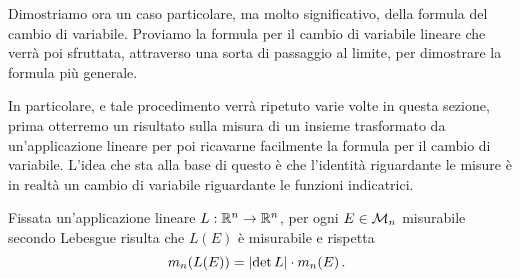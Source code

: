 Dimostriamo ora un caso particolare, ma molto significativo, della formula del cambio di variabile. 
Proviamo la formula per il cambio di variabile lineare che verrà poi sfruttata, attraverso una sorta di passaggio al limite, per dimostrare la formula più generale.

In particolare, e tale procedimento verrà ripetuto varie volte in questa sezione, prima otterremo un risultato sulla misura di un insieme trasformato da un'applicazione lineare per poi ricavarne facilmente la formula per il cambio di variabile. L'idea che sta alla base di questo è che l'identità riguardante le misure è in realtà un cambio di variabile riguardante le funzioni indicatrici.

\begin{proposition}\label{prop:MisuraImmagineLineare}
	Fissata un'applicazione lineare $L:\mathbb R^n\to\mathbb R^n$, per ogni $E\in\mathcal M_n$ misurabile secondo Lebesgue risulta che $L(E)$ è misurabile e rispetta
	\begin{equation}
		m_n(L(E))=\lvert \det L\rvert\cdot m_n(E)\, \text{. }
	\end{equation}
\end{proposition}
